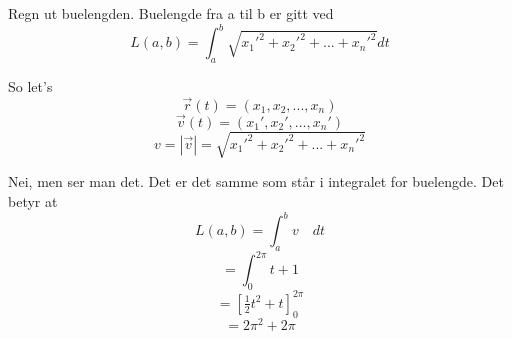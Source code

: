 Regn ut buelengden.
Buelengde fra a til b er gitt ved
$$L(a,b) = \int_a^b\sqrt{x_1'^2 + x_2'^2 + ... + x_n'^2} dt$$

So let's\\
$$\vec{r}(t) = (x_1, x_2, ..., x_n)$$
$$\vec{v}(t) = (x_1', x_2', ..., x_n')$$
$$v = |\vec{v}| = \sqrt{x_1'^2 + x_2'^2 + ... + x_n'^2}$$

Nei, men ser man det.
Det er det samme som står i integralet for buelengde.
Det betyr at
$$L(a,b) = \int_a^bv \quad dt$$
$$= \int_0^{2\pi}t+1$$
$$= [\tfrac{1}{2}t^2 + t]_0^{2\pi}$$
$$= 2\pi^2 + 2\pi$$
